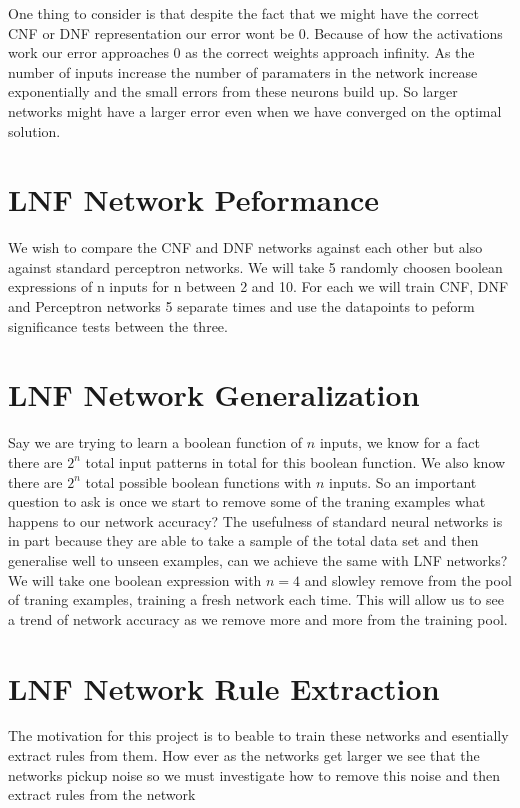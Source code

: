 \documentclass{article}
\theoremstyle{definition}
\begin{document}
One thing to consider is that despite the fact that we might have the correct CNF or DNF representation our error wont be 0. Because of how the activations work our error approaches 0 as the correct weights approach infinity. As the number of inputs increase the number of paramaters in the network increase exponentially and the small errors from these neurons build up. So larger networks might have a larger error even when we have converged on the optimal solution.

\section{LNF Network Peformance}
We wish to compare the CNF and DNF networks against each other but also against standard perceptron networks. We will take 5 randomly choosen boolean expressions of n inputs for n between 2 and 10. For each we will train CNF, DNF and Perceptron networks 5 separate times and use the datapoints to peform significance tests between the three.

\section{LNF Network Generalization}
Say we are trying to learn a boolean function of $n$ inputs, we know for a fact there are $2^n$ total input patterns in total for this boolean function. We also know there are $2^n$ total possible boolean functions with $n$ inputs. So an important question to ask is once we start to remove some of the traning examples what happens to our network accuracy? The usefulness of standard neural networks is in part because they are able to take a sample of the total data set and then generalise well to unseen examples, can we achieve the same with LNF networks?\\

We will take one boolean expression with $n = 4$ and slowley remove from the pool of traning examples, training a fresh network each time. This will allow us to see a trend of network accuracy as we remove more and more from the training pool.

\section{LNF Network Rule Extraction}
The motivation for this project is to beable to train these networks and esentially extract rules from them. How ever as the networks get larger we see that the networks pickup noise so we must investigate how to remove this noise and then extract rules from the network
\end{document}
